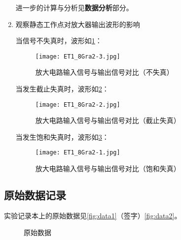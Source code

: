 \documentclass[dvipsnames, svgnames,a4paper,11pt]{article}
\begin{document}
\begin{enumerate}
		进一步的计算与分析见\textbf{\textbf{数据分析}}部分。
		
		\item 观察静态工作点对放大器输出波形的影响
		
			当信号不失真时，波形如\cref{fig:ET1_8Gra2-3}：

			\begin{figure}[htbp]
				\centering
				\texttt{[image: ET1\_8Gra2-3.jpg]}
				\caption{放大电路输入信号与输出信号对比（不失真）}
				\label{fig:ET1_8Gra2-3}
			\end{figure}


			当发生截止失真时，波形如\cref{fig:ET1_8Gra2-2}：

			\begin{figure}[htbp]
				\centering
				\texttt{[image: ET1\_8Gra2-2.jpg]}
				\caption{放大电路输入信号与输出信号对比（截止失真）}
				\label{fig:ET1_8Gra2-2}
			\end{figure}

			当发生饱和失真时，波形如\cref{fig:ET1_8Gra2-1}：

			\begin{figure}[htbp]
				\centering
				\texttt{[image: ET1\_8Gra2-1.jpg]}
				\caption{放大电路输入信号与输出信号对比（饱和失真）}
				\label{fig:ET1_8Gra2-1}
			\end{figure}
		
	\end{enumerate}
	
	
	
	\clearpage
	\subsection{原始数据记录}
	实验记录本上的原始数据见\cref{fig:data1}（签字）\cref{fig:data2}。


	\begin{figure}[htbp]
		\centering
		\quad
		\quad


		\caption{原始数据}
		\label{fig:original_data}
	\end{figure}
	
	
	
	
	
\end{document}
